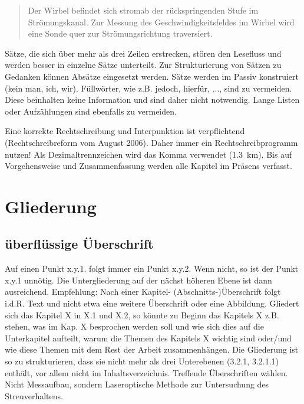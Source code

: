 \begin{quote}
	\glqq Der Wirbel befindet sich stromab der rückspringenden Stufe im Strömungskanal. Zur Messung des Geschwindigkeitsfeldes im Wirbel wird eine Sonde quer zur Strömungsrichtung traversiert.\grqq
\end{quote}

Sätze, die sich über mehr als drei Zeilen erstrecken, stören den Lesefluss und werden besser in einzelne Sätze unterteilt. Zur Strukturierung von Sätzen zu Gedanken können Absätze eingesetzt werden. Sätze werden im Passiv konstruiert (kein \glqq man\grqq, \glqq ich\grqq, \glqq wir\grqq). Füllwörter, wie z.B. \glqq jedoch, hierfür, ...\grqq, sind zu vermeiden. Diese beinhalten keine Information und sind daher nicht notwendig. Lange Listen oder Aufzählungen sind ebenfalls zu vermeiden.

Eine korrekte Rechtschreibung und Interpunktion ist verpflichtend (Rechtschreibreform vom August 2006). Daher immer ein Rechtschreibprogramm nutzen! Als Dezimaltrennzeichen wird das Komma verwendet (\SI{1,3} {\km}). Bis auf Vorgehensweise und Zusammenfassung werden alle Kapitel im Präsens verfasst.

\section{Gliederung}
\label{SECTION:Gliederung}

\subsection{überflüssige Überschrift}

Auf einen Punkt x.y.1. folgt immer ein Punkt x.y.2. Wenn nicht, so ist der Punkt x.y.1 unnötig. Die Untergliederung auf der nächst höheren Ebene ist dann ausreichend. Empfehlung: Nach einer Kapitel- (Abschnitts-)Überschrift folgt i.d.R. Text und nicht etwa eine weitere Überschrift oder eine Abbildung. Gliedert sich das Kapitel X in X.1 und X.2, so könnte zu Beginn das Kapitels X z.B. stehen, was im Kap. X besprochen werden soll und wie sich dies auf die Unterkapitel aufteilt, warum die Themen des Kapitels X wichtig sind oder/und wie diese Themen mit dem Rest der Arbeit zusammenhängen. Die Gliederung ist so zu strukturieren, dass sie nicht mehr als drei Unterebenen (3.2.1, 3.2.1.1) enthält, vor allem nicht im Inhaltsverzeichnis. Treffende Überschriften wählen. Nicht \glqq Messaufbau\grqq, sondern \glqq Laseroptische Methode zur Untersuchung des Streuverhaltens\grqq.


